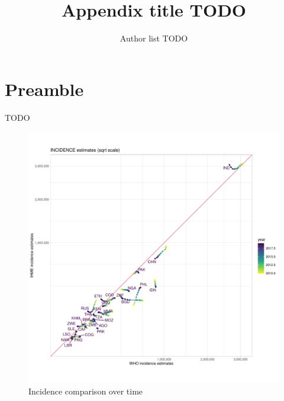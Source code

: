 \documentclass[12pt]{article}
\author{Author list TODO}
\date{}
\title{Appendix title TODO}
\begin{document}
\maketitle
\tableofcontents

\listoffigures


\section{Preamble}
\label{sec:orga0b5156}

TODO


\begin{figure}
  \centering
  \includegraphics[width=1\textwidth]{../plots/aF2a.pdf}
  \caption{Incidence comparison over time}
\end{figure}


\FloatBarrier
\end{document}
